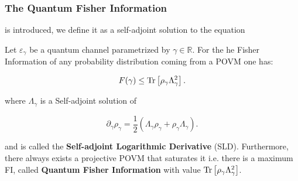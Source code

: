 \subsubsection{The Quantum Fisher Information}

is introduced,  we define it as
a self-adjoint solution to the equation

\begin{theorem}
  Let $\varepsilon_{\gamma}$ be a quantum channel parametrized by $\gamma \in \mathds{R}$. For the he Fisher Information of any probability distribution coming from a POVM one has:

  \begin{equation}
F(\gamma) \leq  \mathrm{Tr}\left[\rho_{\gamma}\Lambda_{\gamma}^{2}\right].
\end{equation}

where $\Lambda_{\gamma}$ is a Self-adjoint solution of

\begin{equation}\label{eq:SLD_definition}
  \partial_{\gamma}\rho_{\gamma} = \frac{1}{2}\left(\Lambda_{\gamma}\rho_{\gamma} + \rho_{\gamma}\Lambda_{\gamma} \right).
\end{equation}

and is called the  \textbf{Self-adjoint Logarithmic Derivative} (SLD). Furthermore, there always exists a projective POVM that saturates it \cite{paris_quantum_2009} i.e. there is a maximum FI, called \textbf{Quantum Fisher Information} with value $\mathrm{Tr}\left[\rho_{\gamma}\Lambda_{\gamma}^{2}\right]$.

\end{theorem}

